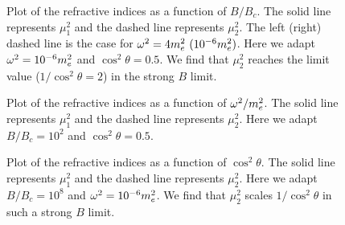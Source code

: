 %
\newpage
\begin{figure}
   \begin{center}
     \centerline{}
       \caption{%
       Plot of the refractive indices as a function of $B/B_c$.  The
       solid line represents $\mu^2_1$ and the dashed line represents
       $\mu^2_2$. The left (right) dashed line is the case for
       $\omega^2 = 4m_e^2 \ (10^{-6} m_e^2)$. Here we adapt $\omega^2
       = 10^{-6} m_e^2$ and $\cos^2\theta = 0.5$. We find that
       $\mu^2_2$ reaches the limit value ($1/\cos^2\theta = 2$) in the
       strong $B$ limit.}
       \label{fig:L_mu}
   \end{center}
\end{figure}
%
\newpage
\begin{figure}
   \begin{center}
     \centerline{}
       \caption{%
       Plot of the refractive indices as a function of
       $\omega^2/m_e^2$. The solid line represents $\mu^2_1$ and the
       dashed line represents $\mu^2_2$. Here we adapt $B/B_c = 10^2$
       and $\cos^2\theta = 0.5$.}
       \label{fig:w_mu}
   \end{center}
\end{figure}
%
\newpage
\begin{figure}
   \begin{center}
     \centerline{}
       \caption{%
       Plot of the refractive indices as a function of $\cos^2\theta$.
       The solid line represents $\mu^2_1$ and the dashed line
       represents $\mu^2_2$. Here we adapt $B/B_c = 10^8$ and
       $\omega^2 = 10^{-6} m_e^2$. We find that $\mu_2^2$ scales
       $1/\cos^2\theta$ in such a strong $B$ limit.}
       \label{fig:c2_mu}
   \end{center}
\end{figure}
%
\newpage




